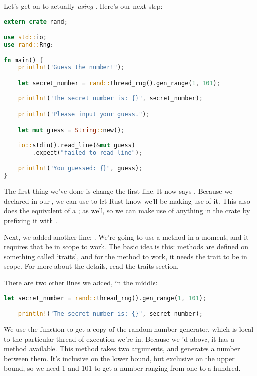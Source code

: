 \blank

Let’s get on to actually \emph{using} . Here’s our next step:

\begin{lstlisting}[language=Rust]
extern crate rand;

use std::io;
use rand::Rng;

fn main() {
    println!("Guess the number!");

    let secret_number = rand::thread_rng().gen_range(1, 101);

    println!("The secret number is: {}", secret_number);

    println!("Please input your guess.");

    let mut guess = String::new();

    io::stdin().read_line(&mut guess)
        .expect("failed to read line");

    println!("You guessed: {}", guess);
}
\end{lstlisting}

The first thing we’ve done is change the first line. It now says . Because we declared  in 
our \code{[dependencies]}, we can use  to let Rust know we’ll be making use of it. This also does the 
equivalent of a ; as well, so we can make use of anything in the  crate by prefixing it with 
.

\blank

Next, we added another  line: . We’re going to use a method in a moment, and it requires that 
 be in scope to work. The basic idea is this: methods are defined on something called ‘traits’, and for the method 
to work, it needs the trait to be in scope. For more about the details, read the traits section.

\blank

There are two other lines we added, in the middle:

\begin{lstlisting}[language=Rust]
    let secret_number = rand::thread_rng().gen_range(1, 101);

    println!("The secret number is: {}", secret_number);
\end{lstlisting}

We use the  function to get a copy of the random number generator, which is local to the particular 
thread of execution we’re in. Because we ’d above, it has a  method available. This 
method takes two arguments, and generates a number between them. It’s inclusive on the lower bound, but exclusive on the upper 
bound, so we need 1 and 101 to get a number ranging from one to a hundred.

